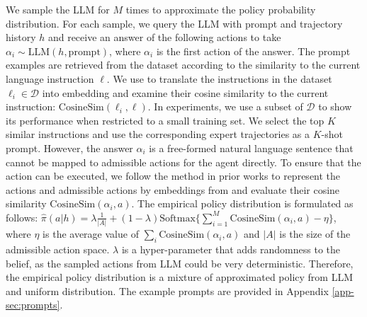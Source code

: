 We sample the LLM for $M$ times to approximate the policy probability distribution. For each sample, we query the LLM with prompt and trajectory history $h$ and receive an answer of the following actions to take $\alpha_i\sim\mathrm{LLM}(h, \mathrm{prompt})$, where $\alpha_i$ is the first action of the answer. The prompt examples are retrieved from the dataset according to the similarity to the current language instruction $\ell$. We use \cite{reimers2019sentence} to translate the instructions in the dataset $\ell_i\in\mathcal{D}$ into embedding and examine their cosine similarity to the current instruction: $\mathrm{CosineSim}(\ell_i, \ell)$. In experiments, we use a subset of $\mathcal{D}$ to show its performance when restricted to a small training set. We select the top $K$ similar instructions and use the corresponding expert trajectories as a $K$-shot prompt. However, the answer $\alpha_i$ is a free-formed natural language sentence that cannot be mapped to admissible actions for the agent directly. To ensure that the action can be executed, we follow the method in prior works \cite{huang2022language} to represent the actions and admissible actions by embeddings from \cite{reimers2019sentence} and evaluate their cosine similarity $\mathrm{CosineSim}(\alpha_i, a)$. The empirical policy distribution is formulated as follows:
    $\hat{\pi}(a|h)=\lambda \frac{1}{|A|} + (1-\lambda)\mathrm{Softmax}\{\sum_{i=1}^M\mathrm{CosineSim}(\alpha_i, a)-\eta\}$,
where $\eta$ is the average value of $\sum_i\mathrm{CosineSim}(\alpha_i, a)$ and $|A|$ is the size of the admissible action space. $\lambda$ is a hyper-parameter that adds randomness to the belief, as the sampled actions from LLM could be very deterministic. Therefore, the empirical policy distribution is a mixture of approximated policy from LLM and uniform distribution. The example prompts are provided in Appendix \ref{app-sec:prompts}. 

